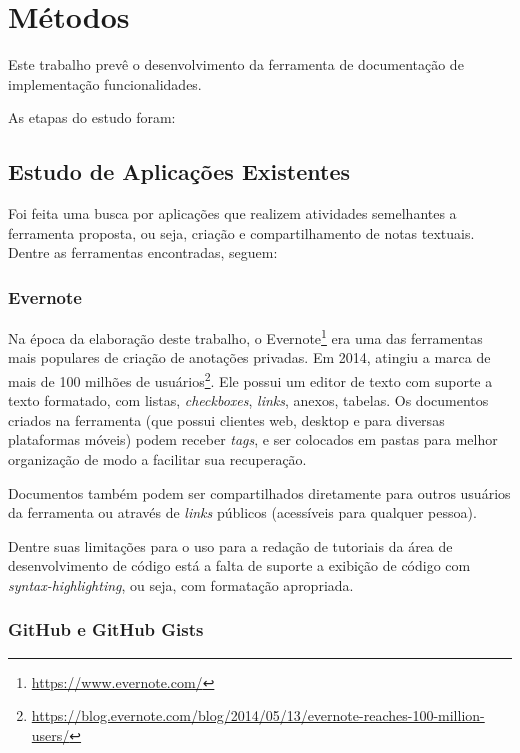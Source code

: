 \chapter{Métodos}

Este trabalho prevê o desenvolvimento da ferramenta de documentação de implementação funcionalidades.

As etapas do estudo foram:

\section{Estudo de Aplicações Existentes}

Foi feita uma busca por aplicações que realizem atividades semelhantes a ferramenta proposta, ou seja, criação e compartilhamento de notas textuais. Dentre as ferramentas encontradas, seguem:

\subsection{Evernote}

Na época da elaboração deste trabalho, o Evernote\footnote{\url{https://www.evernote.com/}} era uma das ferramentas mais populares de criação de anotações privadas. Em 2014, atingiu a marca de mais de 100 milhões de usuários\footnote{\url{https://blog.evernote.com/blog/2014/05/13/evernote-reaches-100-million-users/}}. Ele possui um editor de texto com suporte a texto formatado, com listas, \textit{checkboxes}, \textit{\textit{links}}, anexos, tabelas. Os documentos criados na ferramenta (que possui clientes web, desktop e para diversas plataformas móveis) podem receber \textit{tags}, e ser colocados em pastas para melhor organização de modo a facilitar sua recuperação.


Documentos também podem ser compartilhados diretamente para outros usuários da ferramenta ou através de \textit{links} públicos (acessíveis para qualquer pessoa).

Dentre suas limitações para o uso para a redação de tutoriais da área de desenvolvimento de código está a falta de suporte a exibição de código com \textit{syntax-highlighting}, ou seja, com formatação apropriada.


\subsection{GitHub e GitHub Gists}

